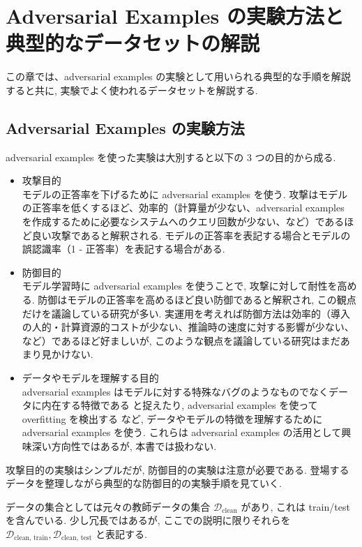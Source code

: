 \section{Adversarial Examples の実験方法と典型的なデータセットの解説}
\label{sec:exp-design-and-data}
この章では、adversarial examples の実験として用いられる典型的な手順を解説すると共に, 実験でよく使われるデータセットを解説する.



\subsection{Adversarial Examples の実験方法}
\label{subsec:exp-design}
adversarial examples を使った実験は大別すると以下の 3 つの目的から成る.
%
\begin{itemize}
  \item 攻撃目的\\
  モデルの正答率を下げるために adversarial examples を使う.
  攻撃はモデルの正答率を低くするほど、効率的（計算量が少ない、adversarial examples を作成するために必要なシステムへのクエリ回数が少ない、など）であるほど良い攻撃であると解釈される.
  モデルの正答率を表記する場合とモデルの誤認識率（1 - 正答率）を表記する場合がある.
  \item 防御目的\\
  モデル学習時に adversarial examples を使うことで, 攻撃に対して耐性を高める.
  防御はモデルの正答率を高めるほど良い防御であると解釈され, この観点だけを議論している研究が多い.
  実運用を考えれば防御方法は効率的（導入の人的・計算資源的コストが少ない、推論時の速度に対する影響が少ない、など）であるほど好ましいが, このような観点を議論している研究はまだあまり見かけない.
  \item データやモデルを理解する目的\\
  adversarial examples はモデルに対する特殊なバグのようなものでなくデータに内在する特徴である \cite{ilyas2019adversarial} と捉えたり, adversarial examples を使って overfitting を検出する \cite{werpachowski2019detecting} など, データやモデルの特徴を理解するために adversarial examples を使う.
  これらは adversarial examples の活用として興味深い方向性ではあるが, 本書では扱わない.
\end{itemize}
%

攻撃目的の実験はシンプルだが, 防御目的の実験は注意が必要である.
登場するデータを整理しながら典型的な防御目的の実験手順を見ていく.

データの集合としては元々の教師データの集合 $\mathcal{D}_{\text{clean}}$ があり, これは train/test を含んでいる.
少し冗長ではあるが, ここでの説明に限りそれらを $\mathcal{D}_{\text{clean, train}}, \mathcal{D}_{\text{clean, test}}$ と表記する.


